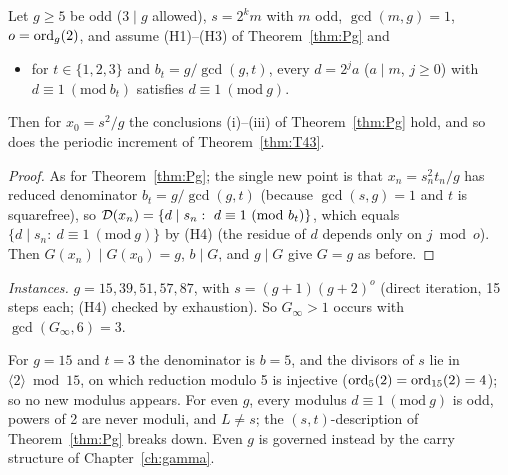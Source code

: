 \begin{theorem}\label{thm:Pstar}
Let \(g\ge5\) be odd (\(3\mid g\) allowed), \(s=2^km\) with \(m\) odd, \(\gcd(m,g)=1\), \(o=\operatorname{ord}_g(2)\), and assume (H1)--(H3) of Theorem~\ref{thm:Pg} and
\begin{itemize}[nosep]
\item[(H4)] for \(t\in\{1,2,3\}\) and \(b_t=g/\gcd(g,t)\), every \(d=2^ja\) (\(a\mid m\), \(j\ge0\)) with \(d\equiv1\ (\mathrm{mod}\ b_t)\) satisfies \(d\equiv1\ (\mathrm{mod}\ g)\).
\end{itemize}
Then for \(x_0=s^2/g\) the conclusions (i)--(iii) of Theorem~\ref{thm:Pg} hold, and so does the periodic increment of Theorem~\ref{thm:T43}.
\end{theorem}
\begin{proof}
As for Theorem~\ref{thm:Pg}; the single new point is that \(x_n=s_n^2t_n/g\) has reduced denominator \(b_t=g/\gcd(g,t)\) (because \(\gcd(s,g)=1\) and \(t\) is squarefree), so \(\Dx(x_n)=\{d\mid s_n:\ d\equiv1\ (\mathrm{mod}\ b_t)\}\), which equals \(\{d\mid s_n:\ d\equiv1\ (\mathrm{mod}\ g)\}\) by (H4) (the residue of \(d\) depends only on \(j\bmod o\)). Then \(G(x_n)\mid G(x_0)=g\), \(b\mid G\), and \(g\mid G\) give \(G=g\) as before.
\end{proof}

\emph{Instances.} \(g=15,39,51,57,87\), with \(s=(g+1)(g+2)^o\) (direct iteration, 15 steps each; (H4) checked by exhaustion). So \(G_\infty>1\) occurs with \(\gcd(G_\infty,6)=3\).

\begin{remark}
For \(g=15\) and \(t=3\) the denominator is \(b=5\), and the divisors of \(s\) lie in \(\langle2\rangle\bmod15\), on which reduction modulo 5 is injective (\(\operatorname{ord}_5(2)=\operatorname{ord}_{15}(2)=4\)); so no new modulus appears. For even \(g\), every modulus \(d\equiv1\ (\mathrm{mod}\ g)\) is odd, powers of 2 are never moduli, and \(L\ne s\); the \((s,t)\)-description of Theorem~\ref{thm:Pg} breaks down. Even \(g\) is governed instead by the carry structure of Chapter~\ref{ch:gamma}.
\end{remark}

